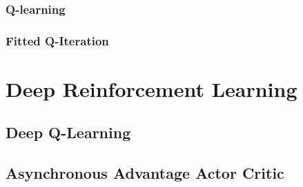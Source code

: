 \subsubsection{Q-learning}

\subsubsection{Fitted Q-Iteration}


\section{Deep Reinforcement Learning}

\subsection{Deep Q-Learning}
\subsection{Asynchronous Advantage Actor Critic}



